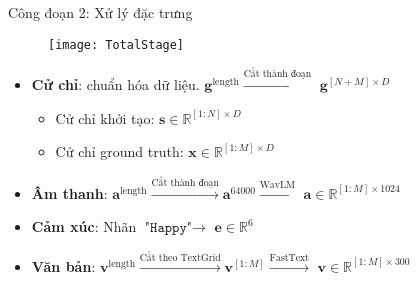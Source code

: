 \begin{frame}{Công đoạn 2: Xử lý đặc trưng}
	
	\begin{figure}
		\texttt{[image: TotalStage]}
	\end{figure}
	
	\begin{itemize}
		\item \textbf{Cử chỉ}: chuẩn hóa dữ liệu. $\mathbf{g}^{\operatorname{length}} \xrightarrow{ \text{Cắt thành đoạn} }$ $\mathbf{g}^{[N + M] \times D}$
		\begin{itemize}
			\item Cử chỉ khởi tạo: $\mathbf{s} \in \mathbb{R}^{[1:N] \times D}$
			\item Cử chỉ ground truth: $\mathbf{x} \in \mathbb{R}^{[1:M] \times D}$
		\end{itemize}
		
		\item \textbf{Âm thanh}:  $\mathbf{a}^{\operatorname{length}} \xrightarrow{ \text{Cắt thành đoạn} } \mathbf{a}^{64000} \xrightarrow{\text{WavLM} } $ $\mathbf{a} \in \mathbb{R}^{[1:M] \times 1024}$ 
		
		\item \textbf{Cảm xúc}:   Nhãn $\texttt{"Happy"} \rightarrow$ $\mathbf{e} \in \mathbb{R}^{6}$ 
		
		\item \textbf{Văn bản}:  $\mathbf{v}^{\operatorname{length}} \xrightarrow{ \text{Cắt theo TextGrid} } \mathbf{v}^{[1:M]} \xrightarrow{ \text{FastText} } $ $\mathbf{v} \in \mathbb{R}^{[1:M] \times 300}$
	\end{itemize}
	
\end{frame}

